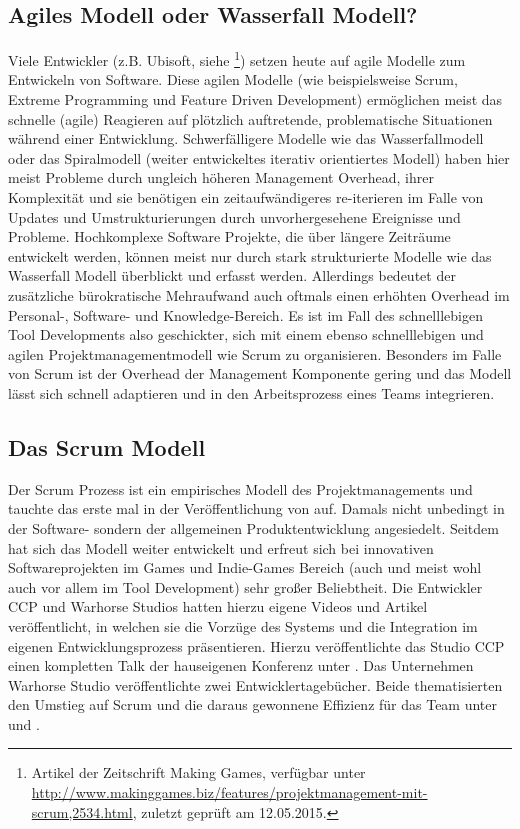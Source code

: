 \documentclass[pagesize, paper=a4, fontsize=12pt, titlepage=true, headings=small, headnosepline, abstractoff, liststotoc, nochapterprefix, plainheadsepline, twoside]{scrreprt}
\begin{document}
\subsection{Agiles Modell oder Wasserfall Modell?}
Viele Entwickler (z.B. Ubisoft, siehe \cite{MKG:Schmitz2014}\footnote{Artikel der Zeitschrift Making Games, verfügbar unter \url{http://www.makinggames.biz/features/projektmanagement-mit-scrum,2534.html}, zuletzt geprüft am 12.05.2015.}) setzen heute auf agile Modelle zum Entwickeln von Software. Diese agilen Modelle (wie beispielsweise Scrum,  Extreme Programming und Feature Driven Development) ermöglichen meist das schnelle (agile) Reagieren auf plötzlich auftretende, problematische Situationen während einer Entwicklung. Schwerfälligere Modelle wie das Wasserfallmodell oder das Spiralmodell (weiter entwickeltes iterativ orientiertes Modell) haben hier meist Probleme durch ungleich höheren Management Overhead, ihrer Komplexität und sie benötigen ein zeitaufwändigeres re-iterieren im Falle von Updates und Umstrukturierungen durch unvorhergesehene Ereignisse und Probleme. Hochkomplexe Software Projekte, die über längere Zeiträume entwickelt werden, können meist nur durch stark strukturierte Modelle wie das Wasserfall Modell überblickt und erfasst werden. Allerdings bedeutet der zusätzliche bürokratische Mehraufwand auch oftmals einen erhöhten Overhead im Personal-, Software- und Knowledge-Bereich. Es ist im Fall des schnelllebigen Tool Developments also geschickter, sich mit einem ebenso schnelllebigen und agilen Projektmanagementmodell wie Scrum zu organisieren. Besonders im Falle von Scrum ist der Overhead der Management Komponente gering und das Modell lässt sich schnell adaptieren und in den Arbeitsprozess eines Teams integrieren.

\subsection{Das Scrum Modell}
Der Scrum Prozess ist ein empirisches Modell des Projektmanagements und tauchte das erste mal in der Veröffentlichung von  auf. Damals nicht unbedingt in der Software- sondern der allgemeinen Produktentwicklung angesiedelt. Seitdem hat sich das Modell weiter entwickelt und erfreut sich bei innovativen Softwareprojekten im Games und Indie-Games Bereich (auch und meist wohl auch vor allem im Tool Development) sehr großer Beliebtheit. Die Entwickler CCP und Warhorse Studios hatten hierzu eigene Videos und Artikel veröffentlicht, in welchen sie die Vorzüge des Systems und die Integration im eigenen Entwicklungsprozess präsentieren. Hierzu veröffentlichte das Studio CCP einen kompletten Talk der hauseigenen Konferenz unter . Das Unternehmen Warhorse Studio veröffentlichte zwei Entwicklertagebücher. Beide thematisierten den Umstieg auf Scrum und die daraus gewonnene Effizienz für das Team unter  und .
\end{document}
